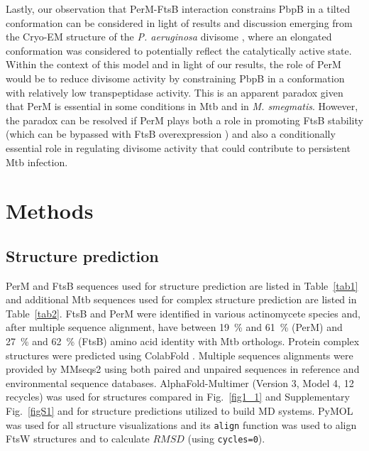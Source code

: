\documentclass[twocolumn,pdflatex,sn-nature]{sn-jnl}%
\newcommand\mtb{Mtb}
\newcommand\msmeg{\textit{M. smegmatis}}
\newcommand\pa{\textit{P. aeruginosa}}
\begin{document}
Lastly, our observation that PerM-FtsB interaction constrains PbpB in a tilted conformation can be considered in light of results and discussion emerging from the Cryo-EM structure of the \pa{} divisome \citep{kashammerCryoEMStructureBacterial2023}, where an elongated conformation was considered to potentially reflect the catalytically active state.
Within the context of this model and in light of our results, the role of PerM would be to reduce divisome activity by constraining PbpB in a conformation with relatively low transpeptidase activity. 
This is an apparent paradox given that PerM is essential in some conditions in \mtb{} and in \msmeg{}.
However, the paradox can be resolved if PerM plays both a role in promoting FtsB stability (which can be bypassed with FtsB overexpression \citep{wangPersistentMycobacteriumTuberculosis2019}) and also a conditionally essential role in regulating divisome activity that could contribute to persistent \mtb{} infection.

\section{Methods}

\subsection{Structure prediction}

PerM and FtsB sequences used for structure prediction are listed in Table~\ref{tab1} and additional \mtb{} sequences used for complex structure prediction are listed in Table~\ref{tab2}.
FtsB and PerM were identified in various actinomycete species and, after multiple sequence alignment, have between \qty{19}{\percent} and \qty{61}{\percent} (PerM) and  \qty{27}{\percent} and \qty{62}{\percent} (FtsB) amino acid identity with \mtb{} orthologs.
Protein complex structures were predicted using ColabFold \citep{mirditaColabFoldMakingProtein2022}. Multiple sequences alignments were provided by MMseqs2 \citep{steineggerMMseqs2EnablesSensitive2017} using both paired and unpaired sequences in reference and environmental sequence databases.
AlphaFold-Multimer \citep{evansProteinComplexPrediction2022} (Version 3, Model 4, 12 recycles) was used for structures compared in Fig.~\ref{fig1_1} and Supplementary Fig.~\ref{figS1} and for structure predictions utilized to build MD systems.
PyMOL \citep{delanoPymolOpensourceMolecular2002} was used for all structure visualizations and its \verb|align| function was used to align FtsW structures and to calculate $RMSD$ (using \verb|cycles=0|).
\end{document}
